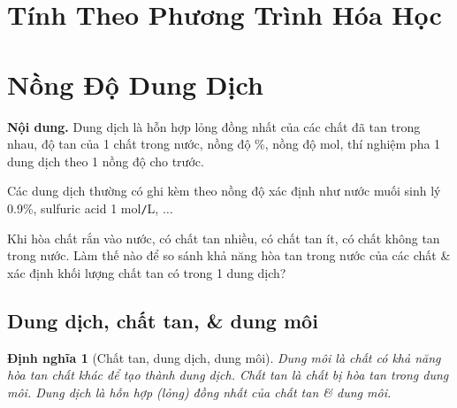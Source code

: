 \documentclass{article}
\newtheorem{dinhnghia}{Định nghĩa}
\begin{document}

\section{Tính Theo Phương Trình Hóa Học}

\noindent{}


\section{Nồng Độ Dung Dịch}
\textsf{\textbf{Nội dung.} Dung dịch là hỗn hợp lỏng đồng nhất của các chất đã tan trong nhau, độ tan của 1 chất trong nước, nồng độ \%, nồng độ mol, thí nghiệm pha 1 dung dịch theo 1 nồng độ cho trước.}

Các dung dịch thường có ghi kèm theo nồng độ xác định như nước muối sinh lý 0.9\%, sulfuric acid 1 mol\texttt{/}L, $\ldots$

Khi hòa chất rắn vào nước, có chất tan nhiều, có chất tan ít, có chất không tan trong nước. Làm thế nào để so sánh khả năng hòa tan trong nước của các chất \& xác định khối lượng chất tan có trong 1 dung dịch?

\subsection{Dung dịch, chất tan, \& dung môi}

\begin{dinhnghia}[Chất tan, dung dịch, dung môi]
	\emph{Dung môi} là chất có khả năng hòa tan chất khác để tạo thành dung dịch. \emph{Chất tan} là chất bị hòa tan trong dung môi. \emph{Dung dịch} là hỗn hợp (lỏng) đồng nhất của chất tan \& dung môi.
\end{dinhnghia}
\end{document}
